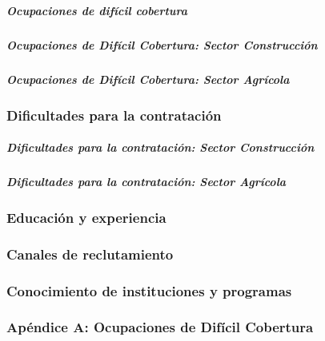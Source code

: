 \documentclass[
]{article}
\begin{document}
\subparagraph{Ocupaciones de difícil
cobertura}\label{ocupaciones-de-difuxedcil-cobertura}

\subparagraph{Ocupaciones de Difícil Cobertura: Sector
Construcción}\label{ocupaciones-de-difuxedcil-cobertura-sector-construcciuxf3n}

\subparagraph{Ocupaciones de Difícil Cobertura: Sector
Agrícola}\label{ocupaciones-de-difuxedcil-cobertura-sector-agruxedcola}

\subsubsection{Dificultades para la
contratación}\label{dificultades-para-la-contrataciuxf3n}

\subparagraph{Dificultades para la contratación: Sector
Construcción}\label{dificultades-para-la-contrataciuxf3n-sector-construcciuxf3n}

\subparagraph{Dificultades para la contratación: Sector
Agrícola}\label{dificultades-para-la-contrataciuxf3n-sector-agruxedcola}

\subsubsection{Educación y
experiencia}\label{educaciuxf3n-y-experiencia}

\subsubsection{Canales de reclutamiento}\label{canales-de-reclutamiento}

\subsubsection{Conocimiento de instituciones y
programas}\label{conocimiento-de-instituciones-y-programas}

\subsubsection{Apéndice A: Ocupaciones de Difícil
Cobertura}\label{apuxe9ndice-a-ocupaciones-de-difuxedcil-cobertura}
\end{document}
